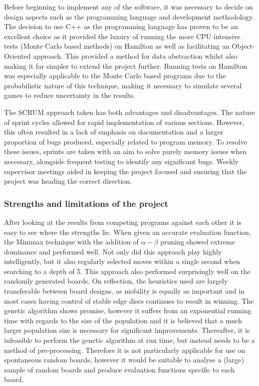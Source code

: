 \documentclass[12pt,a4paper]{article}
\begin{document}
Before beginning to implement any of the software, it was necessary to decide on design aspects such as the programming language and development methodology. The decision to use C++ as the programming language has proven to be an excellent choice as it provided the luxury of running the more CPU intensive tests (Monte Carlo based methods) on Hamilton as well as facilitating an Object-Oriented approach. This provided a method for data abstraction whilst also making it far simpler to extend the project further. Running tests on Hamilton was especially applicable to the Monte Carlo based programs due to the probabilistic nature of this technique, making it necessary to simulate several games to reduce uncertainty in the results. 

The SCRUM approach taken has both advantages and disadvantages. The nature of sprint cycles allowed for rapid implementation of various sections. However, this often resulted in a lack of emphasis on documentation and a larger proportion of bugs produced, especially related to program memory. To resolve these issues, sprints are taken with an aim to solve purely memory issues when necessary, alongside frequent testing to identify any significant bugs. Weekly supervisor meetings aided in keeping the project focused and ensuring that the project was heading the correct direction.

\subsubsection*{Strengths and limitations of the project}

After looking at the results from competing programs against each other it is easy to see where the strengths lie. When given an accurate evaluation function, the Minimax technique with the addition of $\alpha-\beta$ pruning showed extreme dominance and performed well. Not only did this approach play highly intelligently, but it also regularly selected moves within a single second when searching to a depth of 5. This approach also performed surprisingly well on the randomly generated boards. On reflection, the heuristics used are largely transferable between board designs, as mobility is equally as important and in most cases having control of stable edge discs continues to result in winning.
The genetic algorithm shows promise, however it suffers from an exponential running time with regards to the size of the population and it is believed that a much larger population size is necessary for significant improvements. Thereafter, it is infeasible to perform the genetic algorithm at run time, but instead needs to be a method of pre-processing. Therefore it is not particularly applicable for use on spontaneous random boards, however it would be suitable to analyse a (large) sample of random boards and produce evaluation functions specific to each board.
\end{document}
